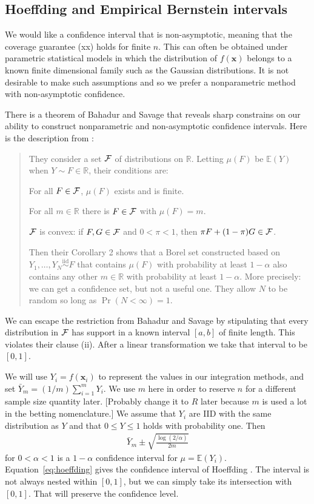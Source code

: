 \documentclass{article}
\newcommand{\art}[1]{\begingroup\color{blue}#1\endgroup}
\renewcommand{\le}{\leqslant}
\newcommand{\real}{\mathbb{R}}
\newcommand{\e}{\mathbb{E}}
\newcommand{\bsx}{\boldsymbol{x}}
\begin{document}
\subsection{Hoeffding and Empirical Bernstein intervals}

We would like a confidence interval that is non-asymptotic,
meaning that the coverage guarantee (xx) holds for finite $n$.
This can often be obtained under parametric statistical
models in which the distribution of $f(\bsx)$  belongs
to a known finite dimensional family such as the Gaussian
distributions.  It is not desirable to make such assumptions
and so we prefer a nonparametric method with non-asymptotic
confidence.  

There is a theorem of Bahadur and Savage \cite{BahSav56} that
reveals sharp constrains on our ability to construct
nonparametric and non-asymptotic confidence
intervals.  Here is the description from \cite{err4qmc}:
\begin{quote}They consider a set $\mathcal{F}$ of distributions on $\real$.
Letting $\mu(F)$ be $\e(Y)$ when $Y\sim F\in\real$, their conditions are:
\begin{compactenum}[\quad (i)]
\item For all $F\in\mathcal{F}$, $\mu(F)$ exists and is finite.
\item For all $m\in\real$ there is $F\in\mathcal{F}$ with $\mu(F)=m$.
\item $\mathcal{F}$ is convex: if $F,G\in\mathcal{F}$ and $0<\pi<1$,
  then $\pi F+(1-\pi)G\in \mathcal{F}$.
\end{compactenum}
Then their Corollary 2 shows that a Borel set constructed
based on $Y_1,\dots,Y_N\stackrel{\mathrm{iid}}
\sim F$
that contains $\mu(F)$ with probability at least $1-\alpha$
also contains any other $m\in\real$ with probability at least $1-\alpha$.
More precisely: we can get a confidence set, but not a useful one.
They allow $N$ to be random so long as $\Pr(N<\infty)=1$.
\end{quote}

We can escape the restriction from Bahadur and
Savage by stipulating that every distribution in $\mathcal{F}$
has support in a known interval $[a,b]$ of finite length.
This violates their clause (ii).
After a linear transformation we take that interval
to be $[0,1]$.

We will use $Y_i = f(\bsx_i)$ to represent 
the values in our integration methods, and 
set $\bar Y_m = (1/m)\sum_{i=1}^mY_i$.  
We use $m$ here in order to reserve $n$ for a
different sample size quantity later.
\art{[Probably change it to $R$ later because $m$ is
used a lot in the betting nomenclature.]}
We assume that $Y_i$ are IID with the same
distribution as $Y$ and that
$0\le Y\le1$ holds with probability one.
Then
\begin{align}\label{eq:hoeffding}
\bar Y_m \pm \sqrt{\frac{\log(2/\alpha)}{2m}}
\end{align}
for $0<\alpha<1$ is a $1-\alpha$ confidence interval for $\mu=\e(Y_i)$.  Equation~\eqref{eq:hoeffding} gives
the confidence interval of Hoeffding \cite{hoef:1963}.  The interval is not always
nested within $[0,1]$, but we can simply take its
intersection with $[0,1]$. That will preserve the confidence level.
\end{document}
